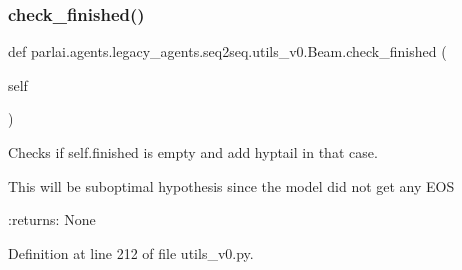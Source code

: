 \mbox{\label{classparlai_1_1agents_1_1legacy__agents_1_1seq2seq_1_1utils__v0_1_1Beam_abea53933203e2126e38657efe715b8b5}} 
\subsubsection{\texorpdfstring{check\+\_\+finished()}{check\_finished()}}
{\footnotesize\ttfamily def parlai.\+agents.\+legacy\+\_\+agents.\+seq2seq.\+utils\+\_\+v0.\+Beam.\+check\+\_\+finished (\begin{DoxyParamCaption}\item[{}]{self }\end{DoxyParamCaption})}

\begin{DoxyVerb}Checks if self.finished is empty and add hyptail in that case.

This will be suboptimal hypothesis since the model did not get any EOS

:returns: None
\end{DoxyVerb}
 

Definition at line 212 of file utils\+\_\+v0.\+py.


